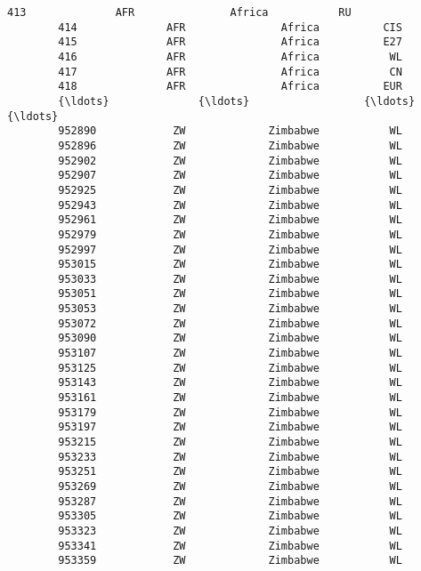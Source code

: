\documentclass[11pt]{article}
\begin{document}
\begin{Verbatim}[commandchars=\\\{\}]
        413              AFR               Africa           RU   
        414              AFR               Africa          CIS   
        415              AFR               Africa          E27   
        416              AFR               Africa           WL   
        417              AFR               Africa           CN   
        418              AFR               Africa          EUR   
        {\ldots}              {\ldots}                  {\ldots}          {\ldots}   
        952890            ZW             Zimbabwe           WL   
        952896            ZW             Zimbabwe           WL   
        952902            ZW             Zimbabwe           WL   
        952907            ZW             Zimbabwe           WL   
        952925            ZW             Zimbabwe           WL   
        952943            ZW             Zimbabwe           WL   
        952961            ZW             Zimbabwe           WL   
        952979            ZW             Zimbabwe           WL   
        952997            ZW             Zimbabwe           WL   
        953015            ZW             Zimbabwe           WL   
        953033            ZW             Zimbabwe           WL   
        953051            ZW             Zimbabwe           WL   
        953053            ZW             Zimbabwe           WL   
        953072            ZW             Zimbabwe           WL   
        953090            ZW             Zimbabwe           WL   
        953107            ZW             Zimbabwe           WL   
        953125            ZW             Zimbabwe           WL   
        953143            ZW             Zimbabwe           WL   
        953161            ZW             Zimbabwe           WL   
        953179            ZW             Zimbabwe           WL   
        953197            ZW             Zimbabwe           WL   
        953215            ZW             Zimbabwe           WL   
        953233            ZW             Zimbabwe           WL   
        953251            ZW             Zimbabwe           WL   
        953269            ZW             Zimbabwe           WL   
        953287            ZW             Zimbabwe           WL   
        953305            ZW             Zimbabwe           WL   
        953323            ZW             Zimbabwe           WL   
        953341            ZW             Zimbabwe           WL   
        953359            ZW             Zimbabwe           WL   
        

\end{Verbatim}
\end{document}
